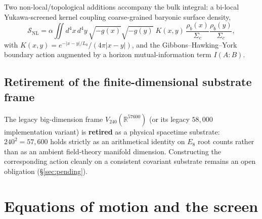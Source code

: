 \documentclass{alienfolio}
\begin{document}
Two non-local/topological additions accompany the bulk integral: a
bi-local Yukawa-screened kernel coupling coarse-grained baryonic surface
density,
\begin{equation}
\mathcal{S}_{\mathrm{NL}} = \alpha\!\iint\! d^4x\,d^4y\,
\sqrt{-g(x)}\sqrt{-g(y)}\;K(x,y)\,
\frac{\rho_b(x)}{\Sigma_c}\frac{\rho_b(y)}{\Sigma_c},
\end{equation}
with $K(x,y) = e^{-|x-y|/L_0}/(4\pi|x-y|)$, and the
Gibbons--Hawking--York boundary action \cite{gh77} augmented by a
horizon mutual-information term $I(A{:}B)$.

\subsection*{Retirement of the finite-dimensional substrate frame}
\label{sec:substrate}

The legacy big-dimension frame $V_{240}(\mathbb{R}^{57600})$ (or its
legacy $58{,}000$ implementation variant) is \textbf{retired} as a
physical spacetime substrate: $240^2 = 57{,}600$ holds strictly as an
arithmetical identity on $E_8$ root counts rather than as an ambient
field-theory manifold dimension. Constructing the corresponding action
cleanly on a consistent covariant substrate remains an open obligation
(\S\ref{sec:pending}).

\section{Equations of motion and the screen}
\end{document}
